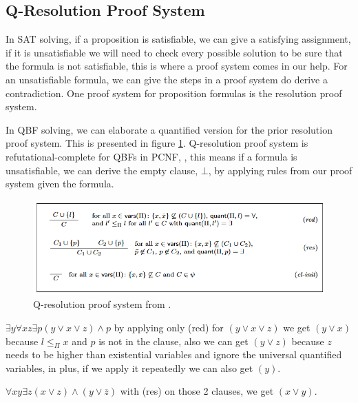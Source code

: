 \subsection{Q-Resolution Proof System}

In SAT solving, if a proposition is satisfiable, we can give a satisfying assignment, if it is unsatisfiable we will need to check every possible solution to be sure that the formula is not satisfiable, this is where a proof system comes in our help. For an unsatisfiable formula, we can give the steps in a proof system do derive a contradiction. One proof system for proposition formulas is the resolution proof system.

In QBF solving, we can elaborate a quantified version for the prior resolution proof system. This is presented in figure \ref{pre:qres}. Q-resolution proof system is refutational-complete for QBFs in PCNF, \cite{handbook}, this means if a formula is unsatisfiable, we can derive the empty clause, $\bot$, by applying rules from our proof system given the formula.


\begin{figure}[H]
\centering
\includegraphics[width=1\textwidth]{../graphics/q-res-proof.png}
\caption{Q-resolution proof system from \cite{handbook}.}
\label{pre:qres}
\end{figure}

\begin{example}
    $\exists y \forall x z \exists p (y \lor x \lor z) \land p$ by applying only (red) for $(y \lor x \lor z)$ we get $(y \lor x)$ because $l \leq_\Pi x$ and $p$ is not in the clause, also we can get $(y \lor z)$ because $z$ needs to be higher than existential variables and ignore the universal quantified variables, in plus, if we apply it repeatedly we can also get $(y)$.
\end{example}


\begin{example}
    $\forall x y \exists z (x \lor z) \land (y \lor \overline{z})$ with (res) on those 2 clauses, we get $(x \lor y)$.
\end{example}


